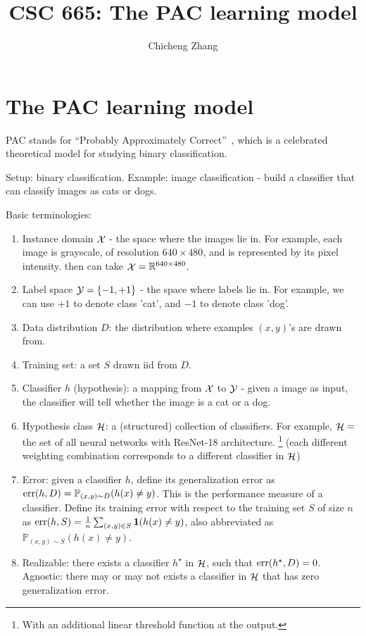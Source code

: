 \documentclass{article}
\title{CSC 665: The PAC learning model}
\author{Chicheng Zhang}
\DeclareMathOperator*{\err}{{\rm err}}
\DeclareMathOperator*{\Xcal}{{\cal X}}
\DeclareMathOperator*{\Hcal}{{\cal H}}
\DeclareMathOperator*{\Ycal}{{\cal Y}}
\newcommand{\RR}{\mathbb{R}} %
\newcommand{\PP}{\mathbb{P}}
\newcommand*{\one}{{\bf 1}}
\begin{document}
\maketitle

\section{The PAC learning model}

PAC stands for ``Probably Approximately Correct''~\cite{valiant1984theory}, which is a celebrated theoretical model for studying binary classification.

Setup: binary classification. Example: image classification - build a classifier
that can classify images as cats or dogs.

Basic terminologies:
\begin{enumerate}
\item Instance domain $\Xcal$ - the space where the images lie in. For example,
each image is grayscale, of resolution $640 \times 480$, and is represented by its pixel intensity.
then can take $\Xcal = \RR^{640 \times 480}$.

\item Label space $\Ycal = \cbr{-1, +1}$ - the space where labels lie in.
For example, we can use $+1$ to denote class 'cat', and $-1$ to denote class 'dog'.

\item Data distribution $D$: the distribution where examples $(x,y)$'s are drawn from.

\item Training set: a set $S$ drawn iid from $D$.

\item Classifier $h$ (hypothesis): a mapping from $\Xcal$ to $\Ycal$ - given a image as input, the
classifier will tell whether the image is a cat or a dog.

\item Hypothesis class $\Hcal$: a (structured) collection of classifiers. For example,
$\Hcal = $ the set of all neural networks with ResNet-18 architecture.
\footnote{With an additional linear threshold function at the output.}
(each different weighting combination corresponds to a different classifier in $\Hcal$)

\item Error: given a classifier $h$, define its generalization error as
$\err(h, D) = \PP_{(x,y) \sim D}(h(x) \neq y)$. This is the performance
measure of a classifier. Define its training error with respect
to the training set $S$ of size $n$ as $\err(h, S) = \frac{1}{n} \sum_{(x,y) \in S} \one(h(x) \neq y)$,
also abbreviated as $\PP_{(x,y) \sim S}(h(x) \neq y)$.

\item Realizable: there exists a classifier $h^\star$ in $\Hcal$, such that
 $\err(h^\star, D) = 0$. Agnostic: there may or may not exists a classifier in $\Hcal$
 that has zero generalization error.
\end{enumerate}
\end{document}
